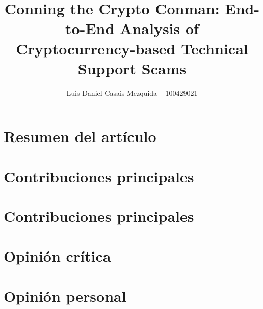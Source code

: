 \documentclass[es]{uc3mreport}
\author{Luis Daniel Casais Mezquida -- 100429021}
\title{Conning the Crypto Conman: End-to-End Analysis of Cryptocurrency-based Technical Support Scams}
\begin{document}
    \makecover

    \begin{report}
        \section{Resumen del artículo}


        \section{Contribuciones principales}


        \section{Contribuciones principales}


        \section{Opinión crítica}


        \section{Opinión personal}


    \end{report}
\end{document}
